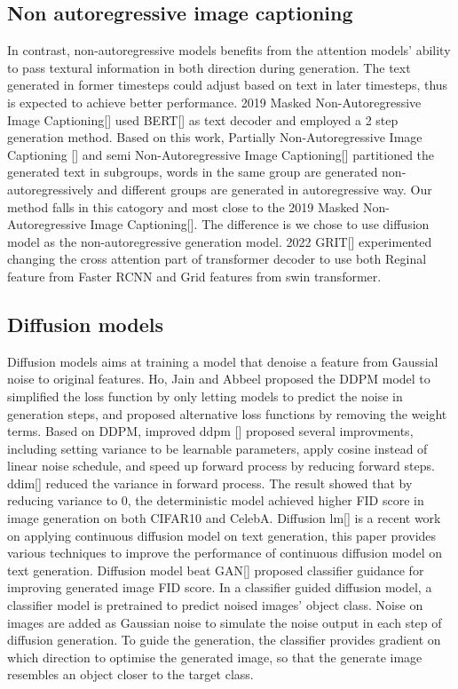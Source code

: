 \documentclass{article}
\begin{document}
\subsection{Non autoregressive image captioning}
In contrast, non-autoregressive models benefits from the attention models' ability to pass textural information in both direction during generation. The text generated in former timesteps could adjust based on text in later timesteps, thus is expected to achieve better performance. 2019 Masked Non-Autoregressive Image Captioning[] used BERT[] as text decoder and employed a 2 step generation method. Based on this work, Partially Non-Autoregressive Image Captioning [] and semi Non-Autoregressive Image Captioning[] partitioned the generated text in subgroups, words in the same group are generated non-autoregressively and different groups are generated in autoregressive way. Our method falls in this catogory and most close to the 2019 Masked Non-Autoregressive Image Captioning[]. The difference is we chose to use diffusion model as the non-autoregressive generation model. 2022 GRIT[] experimented changing the cross attention part of transformer decoder to use both Reginal feature from Faster RCNN and Grid features from swin transformer. 

\subsection{Diffusion models}
Diffusion models aims at training a model that denoise a feature from Gaussial noise to original features. Ho, Jain and Abbeel\cite{DBLP:journals/corr/abs-2006-11239} proposed the DDPM model to simplified the loss function by only letting models to predict the noise in generation steps, and proposed alternative loss functions by removing the weight terms. Based on DDPM, improved ddpm [] proposed several improvments, including setting variance to be learnable parameters, apply cosine instead of linear noise schedule, and speed up forward process by reducing forward steps. ddim[] reduced the variance in forward process. The result showed that by reducing variance to 0, the deterministic model achieved higher FID score in image generation on both CIFAR10 and CelebA. Diffusion lm[] is a recent work on applying continuous diffusion model on text generation, this paper provides various techniques to improve the performance of continuous diffusion model on text generation. Diffusion model beat GAN[] proposed classifier guidance for improving generated image FID score. In a classifier guided diffusion model, a classifier model is pretrained to predict noised images' object class. Noise on images are added as Gaussian noise to simulate the noise output in each step of diffusion generation. To guide the generation, the classifier provides gradient on which direction to optimise the generated image, so that the generate image resembles an object closer to the target class. 
\end{document}
